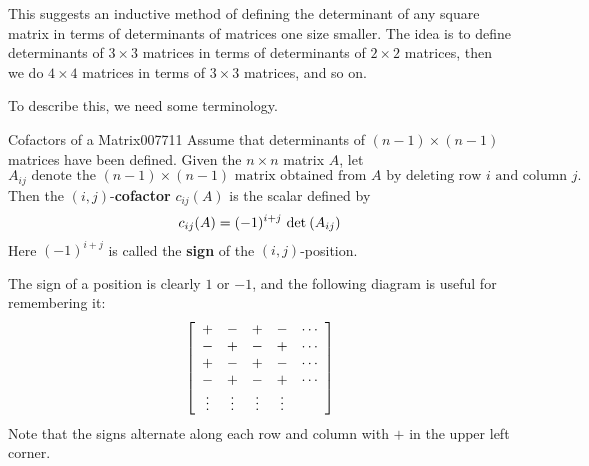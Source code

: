 This suggests an inductive method of 
defining the determinant of any square matrix in terms of determinants 
of matrices one size smaller. The idea is to define determinants of $3 \times 3$
 matrices in terms of determinants of $2 \times 2$ matrices, then we do $4 \times 4$ 
matrices in terms of $3 \times 3$ matrices, and so on.

To describe this, we need some terminology.

\begin{definition}{Cofactors of a Matrix}{007711}
Assume that determinants of $(n - 1) \times (n - 1)$ matrices have been defined. Given the $n \times n$ matrix $A$, let 
\begin{equation*}
A_{ij} \mbox{ denote the } (n - 1) \times (n - 1) \mbox{ matrix  obtained from } A \mbox{ by deleting row } i \mbox{ and column } j.
\end{equation*}
Then the $(i,j)$-\textbf{cofactor} $c_{ij}(A)$ is the scalar defined by 
\begin{equation*}
c_{ij}(A) = (-1)^{i+j} \thinspace\operatorname{det\medspace}(A_{ij})
\end{equation*}
Here $(-1)^{i+j}$ is called the \textbf{sign} of the $(i, j)$-position. 
\end{definition}

\noindent The sign of a position is clearly $1$ or $-1$, and the following diagram is useful for remembering it:
\begin{equation*}
\left[ \begin{array}{ccccc}
+ & - & + & - & \cdots \\
- & + & - & + & \cdots \\
+ & - & + & - & \cdots \\
- & + & - & + & \cdots \\
\vdots & \vdots & \vdots & \vdots & \\
\end{array}\right]
\end{equation*}
Note that the signs alternate along each row and column with $+$ in the upper left corner.


